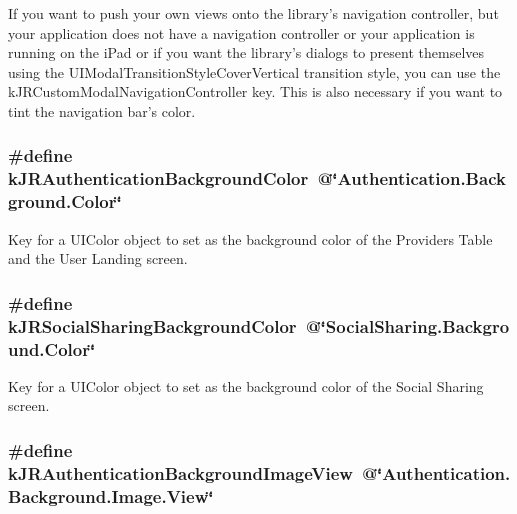 If you want to push your own views onto the library’s navigation controller, but your application does not have a navigation controller or your application is running on the iPad or if you want the library’s dialogs to present themselves using the UIModalTransitionStyleCoverVertical transition style, you can use the kJRCustomModalNavigationController key. This is also necessary if you want to tint the navigation bar’s color. \hypertarget{group__custom_interface_gacfe014997457d27386eff69eb731ce0f}{
\subsubsection[{kJRAuthenticationBackgroundColor}]{\setlength{\rightskip}{0pt plus 5cm}\#define kJRAuthenticationBackgroundColor~@\char`\"{}Authentication.Background.Color\char`\"{}}}
\label{group__custom_interface_gacfe014997457d27386eff69eb731ce0f}
Key for a {\ttfamily UIColor} object to set as the background color of the Providers Table and the User Landing screen. \hypertarget{group__custom_interface_ga404751db179428ee64bbe2fda663efa6}{
\subsubsection[{kJRSocialSharingBackgroundColor}]{\setlength{\rightskip}{0pt plus 5cm}\#define kJRSocialSharingBackgroundColor~@\char`\"{}SocialSharing.Background.Color\char`\"{}}}
\label{group__custom_interface_ga404751db179428ee64bbe2fda663efa6}
Key for a {\ttfamily UIColor} object to set as the background color of the Social Sharing screen. \hypertarget{group__custom_interface_ga68a4950b1b3834ce60218856f596059f}{
\subsubsection[{kJRAuthenticationBackgroundImageView}]{\setlength{\rightskip}{0pt plus 5cm}\#define kJRAuthenticationBackgroundImageView~@\char`\"{}Authentication.Background.Image.View\char`\"{}}}
